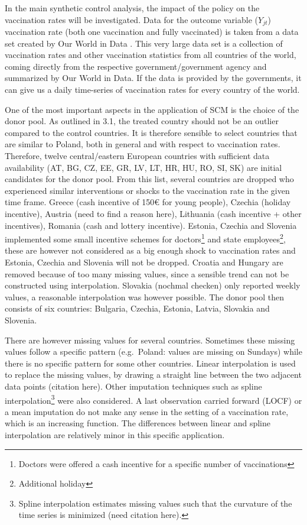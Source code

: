 \documentclass{scrbook}
\begin{document}
In the main synthetic control analysis, the impact of the policy on the
vaccination rates will be investigated. Data for the outcome variable
(\(Y_{jt}\)) vaccination rate (both one vaccination and fully
vaccinated) is taken from a data set created by Our World in Data
\parencite{mathieu_global_2021}. This very large data set is a
collection of vaccination rates and other vaccination statistics from
all countries of the world, coming directly from the respective
government/government agency and summarized by Our World in Data. If the
data is provided by the governments, it can give us a daily time-series
of vaccination rates for every country of the world.

One of the most important aspects in the application of SCM is the
choice of the donor pool. As outlined in 3.1, the treated country should
not be an outlier compared to the control countries. It is therefore
sensible to select countries that are similar to Poland, both in general
and with respect to vaccination rates. Therefore, twelve central/eastern
European countries with sufficient data availability (AT, BG, CZ, EE,
GR, LV, LT, HR, HU, RO, SI, SK) are initial candidates for the donor
pool. From this list, several countries are dropped who experienced
similar interventions or shocks to the vaccination rate in the given
time frame. Greece (cash incentive of 150€ for young people), Czechia
(holiday incentive), Austria (need to find a reason here), Lithuania
(cash incentive + other incentives), Romania (cash and lottery
incentive). Estonia, Czechia and Slovenia implemented some small
incentive schemes for
doctors\footnote{Doctors were offered a cash incentive for a specific number of vaccinations}
and state employees\footnote{Additional holiday}, these are however not
considered as a big enough shock to vaccination rates and Estonia,
Czechia and Slovenia will not be dropped. Croatia and Hungary are
removed because of too many missing values, since a sensible trend can
not be constructed using interpolation. Slovakia (nochmal checken) only
reported weekly values, a reasonable interpolation was however possible.
The donor pool then consists of six countries: Bulgaria, Czechia,
Estonia, Latvia, Slovakia and Slovenia.

There are however missing values for several countries. Sometimes these
missing values follow a specific pattern (e.g.~Poland: values are
missing on Sundays) while there is no specific pattern for some other
countries. Linear interpolation is used to replace the missing values,
by drawing a straight line between the two adjacent data points
(citation here). Other imputation techniques such as spline
interpolation\footnote{Spline interpolation estimates missing values such that the curvature of the time series is minimized (need citation here).}
were also considered. A last observation carried forward (LOCF) or a
mean imputation do not make any sense in the setting of a vaccination
rate, which is an increasing function. The differences between linear
and spline interpolation are relatively minor in this specific
application.
\end{document}
